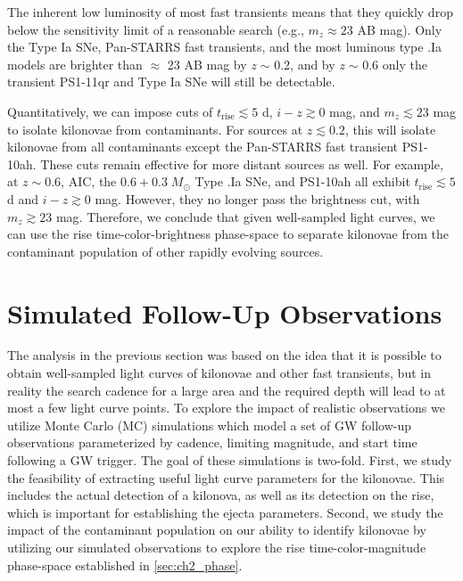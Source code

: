 The inherent low luminosity of most fast transients means that they quickly drop below the sensitivity limit of a reasonable search (e.g., $m_z \approx 23$ AB mag). Only the Type Ia SNe, Pan-STARRS fast transients, and the most luminous type .Ia models are brighter than $\approx$ 23 AB mag by {\em z} $\sim$ 0.2, and by {\em z} $\sim$ 0.6 only the transient PS1-11qr and Type Ia SNe will still be detectable.

Quantitatively, we can impose cuts of $t_{\text{rise}} \lesssim  5$ d, $i-z \gtrsim 0$ mag, and $m_z \lesssim 23$ mag to isolate kilonovae from contaminants. For sources at $z \lesssim 0.2$, this will isolate kilonovae from all contaminants except the Pan-STARRS fast transient PS1-10ah. These cuts remain effective for more distant sources as well. For example, at $z\sim0.6$, AIC, the $0.6+0.3\;M_{\odot}$ Type .Ia SNe, and PS1-10ah all exhibit $t_{\text{rise}} \lesssim  5$ d and $i-z \gtrsim 0$ mag. However, they no longer pass the brightness cut, with $m_z \gtrsim 23$ mag. Therefore, we conclude that given well-sampled light curves, we can use the rise time-color-brightness phase-space to separate kilonovae from the contaminant population of other rapidly evolving sources.

\section{Simulated Follow-Up Observations}
\label{sec:ch2_MCsims}
The analysis in the previous section was based on the idea that it is possible to obtain well-sampled light curves of kilonovae and other fast transients, but in reality the search cadence for a large area and the required depth will lead to at most a few light curve points. To explore the impact of realistic observations we utilize Monte Carlo (MC) simulations which model a set of GW follow-up observations parameterized by cadence, limiting magnitude, and start time following a GW trigger.  The goal of these simulations is two-fold. First, we study the feasibility of extracting useful light curve parameters for the kilonovae. This includes the actual detection of a kilonova, as well as its detection on the rise, which is important for establishing the ejecta parameters. Second, we study the impact of the contaminant population on our ability to identify kilonovae by utilizing our simulated observations to explore the rise time-color-magnitude phase-space established in \autoref{sec:ch2_phase}.

